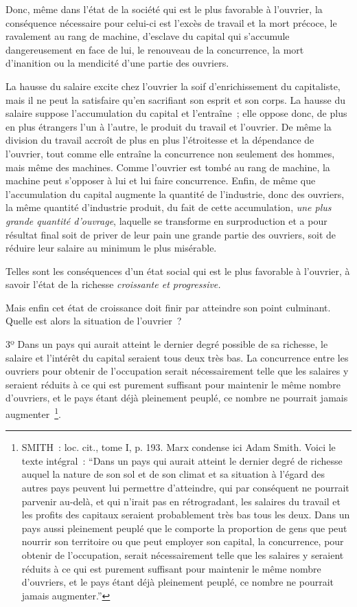 \documentclass[french,twoside]{book} %
\newenvironment{quoteblock}%
  {\begin{quoting}}
  {\end{quoting}}
\newenvironment{quotebar}{%
    \def\FrameCommand{{\color{rubric!10!}\vrule width 0.5em} \hspace{0.9em}}%
    \def\OuterFrameSep{\itemsep} %
    \MakeFramed {\advance\hsize-\width \FrameRestore}
  }%
  {%
    \endMakeFramed
  }
\renewenvironment{quoteblock}%
  {%
    \savenotes
    \setstretch{0.9}
    \normalfont
    \begin{quotebar}
  }
  {%
    \end{quotebar}
    \spewnotes
  }
\begin{document}
Donc, même dans l’état de la société qui est le plus favorable à l’ouvrier, la conséquence nécessaire pour celui-ci est l’excès de travail et la mort précoce, le ravalement au rang de machine, d’esclave du capital qui s’accumule dangereusement en face de lui, le renouveau de la concurrence, la mort d’inanition ou la mendicité d’une partie des ouvriers.\par
[V] La hausse du salaire excite chez l’ouvrier la soif d’enrichissement du capitaliste, mais il ne peut la satisfaire qu’en sacrifiant son esprit et son corps. La hausse du salaire suppose l’accumulation du capital et l’entraîne ; elle oppose donc, de plus en plus étrangers l’un à l’autre, le produit du travail et l’ouvrier. De même la division du travail accroît de plus en plus l’étroitesse et la dépendance de l’ouvrier, tout comme elle entraîne la concurrence non seulement des hommes, mais même des machines. Comme l’ouvrier est tombé au rang de machine, la machine peut s’opposer à lui et lui faire concurrence. Enfin, de même que l’accumulation du capital augmente la quantité de l’industrie, donc des ouvriers, la même quantité d’industrie produit, du fait de cette accumulation, \emph{une plus grande quantité d’ouvrage}, laquelle se transforme en surproduction et a pour résultat final soit de priver de leur pain une grande partie des ouvriers, soit de réduire leur salaire au minimum le plus misérable.\par
Telles sont les conséquences d’un état social qui est le plus favorable à l’ouvrier, à savoir l’état de la richesse \emph{croissante et progressive.}\par
Mais enfin cet état de croissance doit finir par atteindre son point culminant. Quelle est alors la situation de l’ouvrier ?\par

\begin{quoteblock}
 \noindent 3º Dans un pays qui aurait atteint le dernier degré possible de sa richesse, le salaire et l’intérêt du capital seraient tous deux très bas. La concurrence entre les ouvriers pour obtenir de l’occupation serait nécessairement telle que les salaires y seraient réduits à ce qui est purement suffisant pour maintenir le même nombre d’ouvriers, et le pays étant déjà pleinement peuplé, ce nombre ne pourrait jamais augmenter \footnote{SMITH : loc. cit., tome I, p. 193. Marx condense ici Adam Smith. Voici le texte intégral : “Dans un pays qui aurait atteint le dernier degré de richesse auquel la nature de son sol et de son climat et sa situation à l’égard des autres pays peuvent lui permettre d’atteindre, qui par conséquent ne pourrait parvenir au-delà, et qui n’irait pas en rétrogradant, les salaires du travail et les profits des capitaux seraient probablement très bas tous les deux. Dans un pays aussi pleinement peuplé que le comporte la proportion de gens que peut nourrir son territoire ou que peut employer son capital, la concurrence, pour obtenir de l’occupation, serait nécessairement telle que les salaires y seraient réduits à ce qui est purement suffisant pour maintenir le même nombre d’ouvriers, et le pays étant déjà pleinement peuplé, ce nombre ne pourrait jamais augmenter.”}.
 \end{quoteblock}
\end{document}

